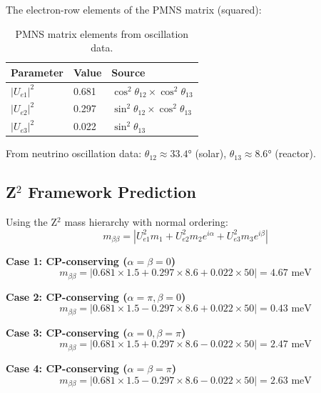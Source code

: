 \documentclass[12pt,a4paper]{article}
\begin{document}
The electron-row elements of the PMNS matrix (squared):

\begin{table}[h]
\centering
\begin{tabular}{@{}lll@{}}
\toprule
Parameter & Value & Source \\
\midrule
$|U_{e1}|^2$ & 0.681 & $\cos^2\theta_{12} \times \cos^2\theta_{13}$ \\
$|U_{e2}|^2$ & 0.297 & $\sin^2\theta_{12} \times \cos^2\theta_{13}$ \\
$|U_{e3}|^2$ & 0.022 & $\sin^2\theta_{13}$ \\
\bottomrule
\end{tabular}
\caption{PMNS matrix elements from oscillation data.}
\end{table}

From neutrino oscillation data: $\theta_{12} \approx 33.4°$ (solar), $\theta_{13} \approx 8.6°$ (reactor).

\subsection{Z$^2$ Framework Prediction}

Using the Z$^2$ mass hierarchy with normal ordering:
\begin{equation}
m_{\beta\beta} = |U_{e1}^2 m_1 + U_{e2}^2 m_2 e^{i\alpha} + U_{e3}^2 m_3 e^{i\beta}|
\end{equation}

\textbf{Case 1: CP-conserving ($\alpha = \beta = 0$)}
\begin{equation}
m_{\beta\beta} = |0.681 \times 1.5 + 0.297 \times 8.6 + 0.022 \times 50| = 4.67 \text{ meV}
\end{equation}

\textbf{Case 2: CP-conserving ($\alpha = \pi, \beta = 0$)}
\begin{equation}
m_{\beta\beta} = |0.681 \times 1.5 - 0.297 \times 8.6 + 0.022 \times 50| = 0.43 \text{ meV}
\end{equation}

\textbf{Case 3: CP-conserving ($\alpha = 0, \beta = \pi$)}
\begin{equation}
m_{\beta\beta} = |0.681 \times 1.5 + 0.297 \times 8.6 - 0.022 \times 50| = 2.47 \text{ meV}
\end{equation}

\textbf{Case 4: CP-conserving ($\alpha = \beta = \pi$)}
\begin{equation}
m_{\beta\beta} = |0.681 \times 1.5 - 0.297 \times 8.6 - 0.022 \times 50| = 2.63 \text{ meV}
\end{equation}
\end{document}
